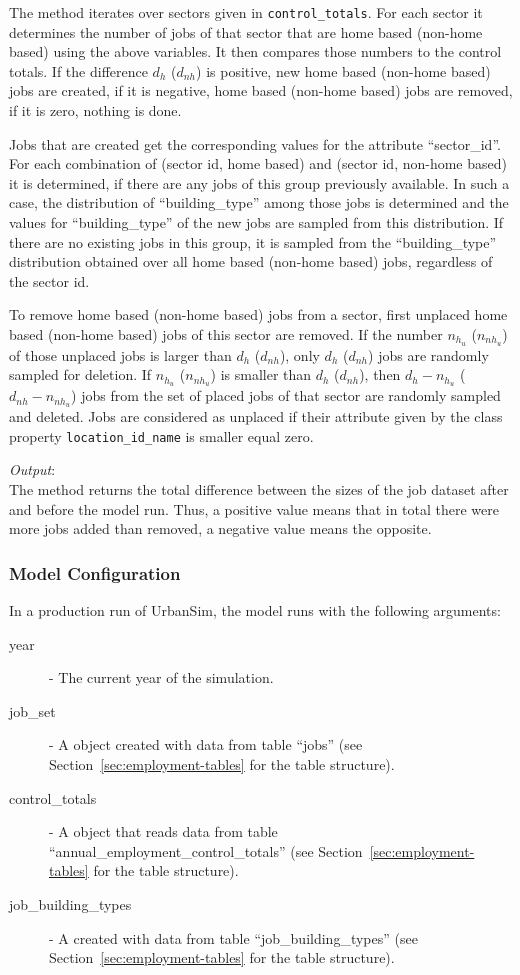 The method iterates over sectors given in \verb|control_totals|. For each
sector it determines the number of jobs of that sector that are home based
(non-home based) using the above variables. It then compares those numbers to
the control totals.  If the difference $d_h$ ($d_{nh}$) is positive, new home
based (non-home based) jobs are created, if it is negative, home based
(non-home based) jobs are removed, if it is zero, nothing is done.

Jobs that are created get the corresponding values for the attribute 
``sector_id''. For each combination of (sector id, home based) and (sector id, non-home based) 
it is determined, if there are any jobs of this group
previously available. In such a case, the distribution of ``building_type'' among those jobs is
determined and the values for ``building_type'' of the new jobs are sampled
from this distribution. If there are no existing jobs in this group, it is
sampled from the ``building_type'' distribution obtained over all home based
(non-home based) jobs, regardless of the sector id.

To remove home based (non-home based) jobs from a sector, first unplaced home
based (non-home based) jobs of this sector are removed. If the number $n_{h_u}$
($n_{nh_u}$) of those unplaced jobs is larger than $d_h$ ($d_{nh}$), only
$d_h$ ($d_{nh}$) jobs are randomly sampled for deletion. If $n_{h_u}$
($n_{nh_u}$) is smaller than $d_h$ ($d_{nh}$), then $d_h-n_{h_u}$
($d_{nh}-n_{nh_u}$) jobs from the set of placed jobs of that sector are
randomly sampled and deleted. Jobs are considered as unplaced if their
attribute given by the class property \verb|location_id_name| is smaller equal zero.

{\it Output}:~\\[1mm]
The method returns the total difference between the sizes of the job
dataset  after and before the model run. Thus, a positive value means that in
total there were more jobs added than removed, a negative value means
the opposite.

\subsubsection{Model Configuration}
%
In a production run of UrbanSim, the model runs with the following arguments:
\begin{description}
\item[year] - The current year of the simulation.
\item[job_set] - A  object created with data from
  table ``jobs'' (see Section~\ref{sec:employment-tables}
  for the table structure).
\item[control_totals] - A  object  that reads data from table
  ``annual_employment_control_totals'' (see
  Section~\ref{sec:employment-tables} for the table structure).
\item[job_building_types] - A  created with data from table 
``job_building_types'' (see Section~\ref{sec:employment-tables}
  for the table structure).
\end{description}


